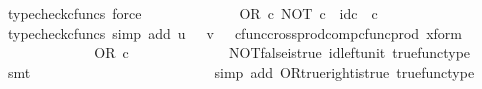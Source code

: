 \begin{isabellebody}
\ {\isacharparenleft}{\kern0pt}typecheck{\isacharunderscore}{\kern0pt}cfuncs{\isacharcomma}{\kern0pt}\ force{\isacharparenright}{\kern0pt}\isanewline
\ \ \ \ \ \ \ \ \isamarkupfalse%
\ \isamarkupfalse%
\ {\isachardoublequoteopen}{\isachardot}{\kern0pt}{\isachardot}{\kern0pt}{\isachardot}{\kern0pt}\ {\isacharequal}{\kern0pt}\ OR\ {\isasymcirc}\isactrlsub c\ {\isasymlangle}NOT\ {\isasymcirc}\isactrlsub c\ {\isasymf}{\isacharcomma}{\kern0pt}\ id\isactrlsub c\ {\isasymOmega}\ {\isasymcirc}\isactrlsub c\ {\isasymt}{\isasymrangle}{\isachardoublequoteclose}\isanewline
\ \ \ \ \ \ \ \ \ \ \isamarkupfalse%
\ {\isacharparenleft}{\kern0pt}typecheck{\isacharunderscore}{\kern0pt}cfuncs{\isacharcomma}{\kern0pt}\ simp\ add{\isacharcolon}{\kern0pt}\ {\isacartoucheopen}u\ {\isacharequal}{\kern0pt}\ {\isasymf}{\isacartoucheclose}\ {\isacartoucheopen}v\ {\isacharequal}{\kern0pt}\ {\isasymt}{\isacartoucheclose}\ cfunc{\isacharunderscore}{\kern0pt}cross{\isacharunderscore}{\kern0pt}prod{\isacharunderscore}{\kern0pt}comp{\isacharunderscore}{\kern0pt}cfunc{\isacharunderscore}{\kern0pt}prod\ x{\isacharunderscore}{\kern0pt}form{\isacharparenright}{\kern0pt}\isanewline
\ \ \ \ \ \ \ \ \isamarkupfalse%
\ \isamarkupfalse%
\ {\isachardoublequoteopen}{\isachardot}{\kern0pt}{\isachardot}{\kern0pt}{\isachardot}{\kern0pt}\ {\isacharequal}{\kern0pt}\ OR\ {\isasymcirc}\isactrlsub c\ {\isasymlangle}{\isasymt}{\isacharcomma}{\kern0pt}\ {\isasymt}{\isasymrangle}{\isachardoublequoteclose}\isanewline
\ \ \ \ \ \ \ \ \ \ \isamarkupfalse%
\ NOT{\isacharunderscore}{\kern0pt}false{\isacharunderscore}{\kern0pt}is{\isacharunderscore}{\kern0pt}true\ id{\isacharunderscore}{\kern0pt}left{\isacharunderscore}{\kern0pt}unit{}\ true{\isacharunderscore}{\kern0pt}func{\isacharunderscore}{\kern0pt}type\ \isamarkupfalse%
\ smt\isanewline
\ \ \ \ \ \ \ \ \isamarkupfalse%
\ \isamarkupfalse%
\ {\isachardoublequoteopen}{\isachardot}{\kern0pt}{\isachardot}{\kern0pt}{\isachardot}{\kern0pt}\ {\isacharequal}{\kern0pt}\ {\isasymt}{\isachardoublequoteclose}\isanewline
\ \ \ \ \ \ \ \ \ \ \isamarkupfalse%
\ {\isacharparenleft}{\kern0pt}simp\ add{\isacharcolon}{\kern0pt}\ OR{\isacharunderscore}{\kern0pt}true{\isacharunderscore}{\kern0pt}right{\isacharunderscore}{\kern0pt}is{\isacharunderscore}{\kern0pt}true\ true{\isacharunderscore}{\kern0pt}func{\isacharunderscore}{\kern0pt}type{\isacharparenright}{\kern0pt}\isanewline
\ \ \ \ \ \ \ \ \isamarkupfalse%

\end{isabellebody}
